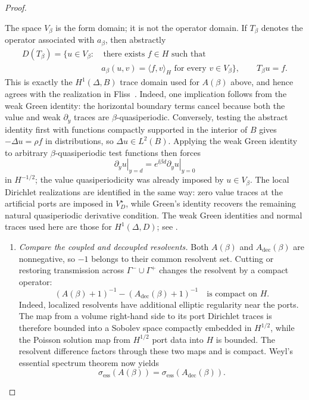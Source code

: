 \begin{proof}
\begin{proofremark}
The space $V_\beta$ is the form domain; it is not the operator domain.  If
$T_\beta$ denotes the operator associated with $a_\beta$, then abstractly
\[
\begin{aligned}
  D(T_\beta)=\bigl\{u\in V_\beta:{}&\ \text{there exists }f\in H
  \text{ such that}\\[-1mm]
  &a_\beta(u,v)=\langle f,v\rangle_H
  \text{ for every }v\in V_\beta\bigr\},
  \qquad T_\beta u=f.
\end{aligned}
\]
This is exactly the $H^1(\Delta,B)$ trace domain used for $A(\beta)$ above,
and hence agrees with the realization in Fliss~\cite[Section~3]{Fliss2013}.
Indeed, one implication follows from the weak Green identity: the horizontal
boundary terms cancel because both the value and weak $\partial_y$ traces are
$\beta$-quasiperiodic.  Conversely, testing the abstract identity first
with functions compactly supported in the interior of $B$ gives
$-\Delta u=\rho f$ in distributions, so $\Delta u\in L^2(B)$.  Applying the
weak Green identity to arbitrary $\beta$-quasiperiodic test functions then
forces
\[
  \left.\partial_yu\right|_{y=d}
  =e^{\ii\beta d}\left.\partial_yu\right|_{y=0}
\]
in $H^{-1/2}$; the value quasiperiodicity was already imposed by
$u\in V_\beta$.  The local Dirichlet realizations are identified in the same
way: zero value traces at the artificial ports are imposed in
$V_D^\star$, while Green's identity recovers the remaining natural
quasiperiodic derivative condition.  The weak Green identities and normal
traces used here are those for $H^1(\Delta,D)$; see
\cite[Chapters~3--4]{McLean2000}.
\end{proofremark}

\begin{enumerate}[label=\textit{Step \arabic*.},leftmargin=*,start=2]

\item \emph{Compare the coupled and decoupled resolvents.}
Both $A(\beta)$ and $A_{\mathrm{dec}}(\beta)$ are nonnegative, so
$-1$ belongs to their common resolvent set.  Cutting or restoring transmission
across $\Gamma^-\cup\Gamma^+$ changes the resolvent by a compact operator:
\begin{equation*}
  (A(\beta)+1)^{-1}-(A_{\mathrm{dec}}(\beta)+1)^{-1}
  \quad\text{is compact on }H.
\end{equation*}
Indeed, localized resolvents have additional elliptic regularity near the
ports.  The map from a volume right-hand side to its port Dirichlet traces is
therefore bounded into a Sobolev space compactly embedded in $H^{1/2}$, while
the Poisson solution map from $H^{1/2}$ port data into $H$ is bounded.  The
resolvent difference factors through these two maps and is compact.
Weyl's essential spectrum theorem
\cite[Theorem~XIII.14]{ReedSimon1978} now yields
\[
  \sigma_{\mathrm{ess}}(A(\beta))
  =\sigma_{\mathrm{ess}}(A_{\mathrm{dec}}(\beta)).
\]


\end{enumerate}
\end{proof}
